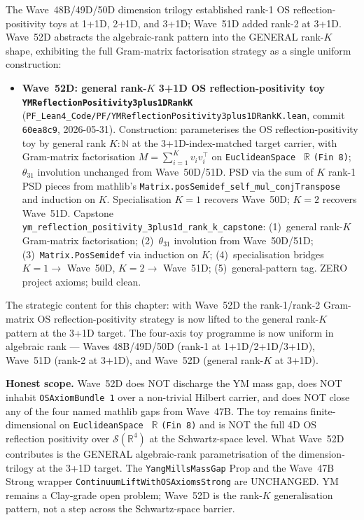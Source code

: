 \begin{remark}\label{rem:ym-wave52d-lean}
The Wave~48B/49D/50D dimension trilogy established rank-1 OS reflection-positivity toys at 1+1D, 2+1D, and 3+1D; Wave~51D added rank-2 at 3+1D. Wave~52D abstracts the algebraic-rank pattern into the GENERAL rank-$K$ shape, exhibiting the full Gram-matrix factorisation strategy as a single uniform construction:
\begin{itemize}
  \item \textbf{Wave~52D: general rank-$K$ 3+1D OS reflection-positivity toy \texttt{YMReflectionPositivity3plus1DRankK}} (\texttt{PF\_Lean4\_Code/PF/YMReflectionPositivity3plus1DRankK.lean}, commit \texttt{60ea8c9}, 2026-05-31). Construction: parameterises the OS reflection-positivity toy by general rank $K : \mathbb{N}$ at the 3+1D-index-matched target carrier, with Gram-matrix factorisation $M = \sum_{i = 1}^K v_i v_i^\top$ on \texttt{EuclideanSpace } $\mathbb{R}$ \texttt{(Fin 8)}; $\theta_{31}$ involution unchanged from Wave~50D/51D. PSD via the sum of $K$ rank-1 PSD pieces from mathlib's \texttt{Matrix.posSemidef\_self\_mul\_conjTranspose} and induction on $K$. Specialisation $K = 1$ recovers Wave~50D; $K = 2$ recovers Wave~51D. Capstone \texttt{ym\_reflection\_positivity\_3plus1d\_rank\_k\_capstone}: (1)~general rank-$K$ Gram-matrix factorisation; (2)~$\theta_{31}$ involution from Wave~50D/51D; (3)~\texttt{Matrix.PosSemidef} via induction on $K$; (4)~specialisation bridges $K = 1 \to$ Wave~50D, $K = 2 \to$ Wave~51D; (5)~general-pattern tag. ZERO project axioms; build clean.
\end{itemize}
The strategic content for this chapter: with Wave~52D the rank-1/rank-2 Gram-matrix OS reflection-positivity strategy is now lifted to the general rank-$K$ pattern at the 3+1D target. The four-axis toy programme is now uniform in algebraic rank --- Waves 48B/49D/50D (rank-1 at 1+1D/2+1D/3+1D), Wave~51D (rank-2 at 3+1D), and Wave~52D (general rank-$K$ at 3+1D).

\textbf{Honest scope.} Wave~52D does NOT discharge the YM mass gap, does NOT inhabit \texttt{OSAxiomBundle 1} over a non-trivial Hilbert carrier, and does NOT close any of the four named mathlib gaps from Wave~47B. The toy remains finite-dimensional on \texttt{EuclideanSpace } $\mathbb{R}$ \texttt{(Fin 8)} and is NOT the full 4D OS reflection positivity over $\mathcal{S}(\mathbb{R}^4)$ at the Schwartz-space level. What Wave~52D contributes is the GENERAL algebraic-rank parametrisation of the dimension-trilogy at the 3+1D target. The \texttt{YangMillsMassGap} Prop and the Wave~47B Strong wrapper \texttt{ContinuumLiftWithOSAxiomsStrong} are UNCHANGED. YM remains a Clay-grade open problem; Wave~52D is the rank-$K$ generalisation pattern, not a step across the Schwartz-space barrier.
\end{remark}

